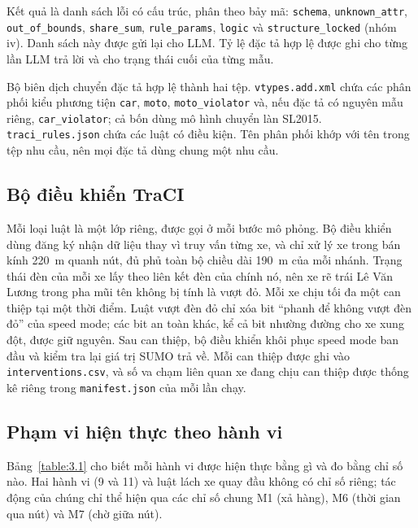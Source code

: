 \documentclass[../main.tex]{subfiles}
\begin{document}
Kết quả là danh sách lỗi có cấu trúc, phân theo bảy mã: \texttt{schema}, \texttt{unknown\_attr}, \texttt{out\_of\_bounds}, \texttt{share\_sum}, \texttt{rule\_params}, \texttt{logic} và \texttt{structure\_locked} (nhóm iv). Danh sách này được gửi lại cho LLM. Tỷ lệ đặc tả hợp lệ được ghi cho từng lần LLM trả lời và cho trạng thái cuối của từng mẫu.

Bộ biên dịch chuyển đặc tả hợp lệ thành hai tệp. \texttt{vtypes.add.xml} chứa các phân phối kiểu phương tiện \texttt{car}, \texttt{moto}, \texttt{moto\_violator} và, nếu đặc tả có nguyên mẫu riêng, \texttt{car\_violator}; cả bốn dùng mô hình chuyển làn SL2015. \texttt{traci\_rules.json} chứa các luật có điều kiện. Tên phân phối khớp với tên trong tệp nhu cầu, nên mọi đặc tả dùng chung một nhu cầu.

\subsection{Bộ điều khiển TraCI}
\label{subsection:impl_controller}

Mỗi loại luật là một lớp riêng, được gọi ở mỗi bước mô phỏng. Bộ điều khiển dùng đăng ký nhận dữ liệu thay vì truy vấn từng xe, và chỉ xử lý xe trong bán kính 220~m quanh nút, đủ phủ toàn bộ chiều dài 190~m của mỗi nhánh. Trạng thái đèn của mỗi xe lấy theo liên kết đèn của chính nó, nên xe rẽ trái Lê Văn Lương trong pha mũi tên không bị tính là vượt đỏ. Mỗi xe chịu tối đa một can thiệp tại một thời điểm. Luật vượt đèn đỏ chỉ xóa bit ``phanh để không vượt đèn đỏ'' của speed mode; các bit an toàn khác, kể cả bit nhường đường cho xe xung đột, được giữ nguyên. Sau can thiệp, bộ điều khiển khôi phục speed mode ban đầu và kiểm tra lại giá trị SUMO trả về. Mỗi can thiệp được ghi vào \texttt{interventions.csv}, và số va chạm liên quan xe đang chịu can thiệp được thống kê riêng trong \texttt{manifest.json} của mỗi lần chạy.

\subsection{Phạm vi hiện thực theo hành vi}
\label{subsection:impl_status}

Bảng~\ref{table:3.1} cho biết mỗi hành vi được hiện thực bằng gì và đo bằng chỉ số nào. Hai hành vi (9 và 11) và luật lách xe quay đầu không có chỉ số riêng; tác động của chúng chỉ thể hiện qua các chỉ số chung M1 (xả hàng), M6 (thời gian qua nút) và M7 (chờ giữa nút).
\end{document}
